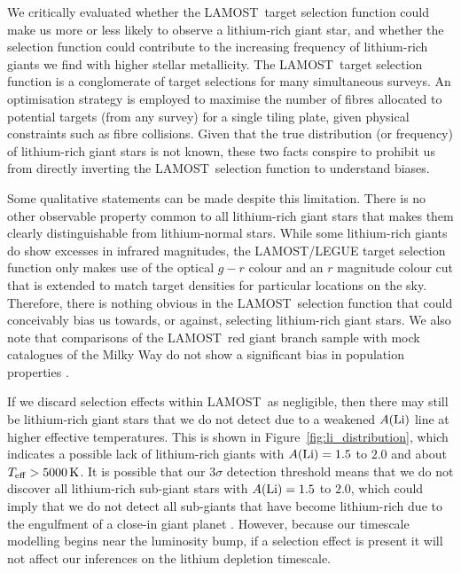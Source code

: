 \documentclass[twocolumn]{aastex62}
\newcommand\lamost{LAMOST}
\begin{document}
We critically evaluated whether the \lamost\ target selection function could 
make us more or less likely to observe a lithium-rich giant star, and whether
the selection function could contribute to the increasing frequency of lithium-rich
giants we find with higher stellar metallicity. The \lamost\ target selection function
is a conglomerate of target selections for many simultaneous surveys. An
optimisation strategy is employed to maximise the number of fibres allocated
to potential targets (from any survey) for a single tiling plate, given physical
constraints such as fibre collisions. Given that the true distribution (or 
frequency) of lithium-rich giant stars is not known, these two facts conspire 
to prohibit us from directly inverting the \lamost\ selection function to 
understand biases. 

Some qualitative statements can be made despite this limitation. There
is no other observable property common to all lithium-rich giant stars that makes
them clearly distinguishable from lithium-normal stars. While some
lithium-rich giants do show excesses in infrared magnitudes, the LAMOST/LEGUE 
target selection function \citep{Carlin_2012} only makes use of the optical $g-r$
colour and an $r$ magnitude colour cut that is extended to match target 
densities for particular locations on the sky. Therefore, there is nothing
obvious in the \lamost\ selection function that could conceivably bias us towards,
or against, selecting lithium-rich giant stars. We also note that comparisons of 
the \lamost\ red giant branch sample with mock catalogues of the Milky Way 
do not show a significant bias in population properties \citep{Liu_2017}.


If we discard selection effects within \lamost\ as negligible, then there may still
be lithium-rich giant stars that we do not detect due to a weakened $A({\rm Li})$
line at higher effective temperatures. This is shown in Figure~\ref{fig:li_distribution},
which indicates a possible lack of lithium-rich giants with $A({\rm Li}) = 1.5$ to $2.0$
and about $T_{\rm eff} > 5000\,{\rm K}$. It is possible that our $3\sigma$ detection
threshold means that we do not discover all lithium-rich sub-giant stars with $A({\rm Li}) = 1.5$ to $2.0$, which could imply that we do not detect all sub-giants that have become lithium-rich due to the engulfment of a close-in giant planet \citep{Casey_2016}. However, because our timescale modelling begins near the luminosity bump, if a selection effect is present it will not
affect our inferences on the lithium depletion timescale.
\end{document}
